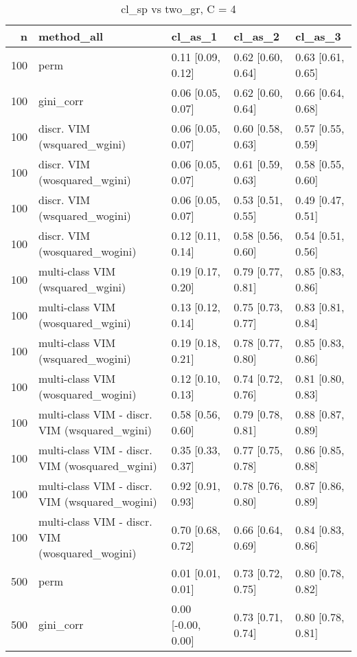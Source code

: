 \begin{table}[ht]
\centering
\caption{cl\_sp vs two\_gr, C = 4} 
\begin{tabular}{rllll}
  \hline
n & method\_all & cl\_as\_1 & cl\_as\_2 & cl\_as\_3 \\ 
  \hline
100 & perm & 0.11 [0.09, 0.12] & 0.62 [0.60, 0.64] & 0.63 [0.61, 0.65] \\ 
  100 & gini\_corr & 0.06 [0.05, 0.07] & 0.62 [0.60, 0.64] & 0.66 [0.64, 0.68] \\ 
  100 & discr. VIM (wsquared\_wgini) & 0.06 [0.05, 0.07] & 0.60 [0.58, 0.63] & 0.57 [0.55, 0.59] \\ 
  100 & discr. VIM (wosquared\_wgini) & 0.06 [0.05, 0.07] & 0.61 [0.59, 0.63] & 0.58 [0.55, 0.60] \\ 
  100 & discr. VIM (wsquared\_wogini) & 0.06 [0.05, 0.07] & 0.53 [0.51, 0.55] & 0.49 [0.47, 0.51] \\ 
  100 & discr. VIM (wosquared\_wogini) & 0.12 [0.11, 0.14] & 0.58 [0.56, 0.60] & 0.54 [0.51, 0.56] \\ 
  100 & multi-class VIM (wsquared\_wgini) & 0.19 [0.17, 0.20] & 0.79 [0.77, 0.81] & 0.85 [0.83, 0.86] \\ 
  100 & multi-class VIM (wosquared\_wgini) & 0.13 [0.12, 0.14] & 0.75 [0.73, 0.77] & 0.83 [0.81, 0.84] \\ 
  100 & multi-class VIM (wsquared\_wogini) & 0.19 [0.18, 0.21] & 0.78 [0.77, 0.80] & 0.85 [0.83, 0.86] \\ 
  100 & multi-class VIM (wosquared\_wogini) & 0.12 [0.10, 0.13] & 0.74 [0.72, 0.76] & 0.81 [0.80, 0.83] \\ 
  100 & multi-class VIM - discr. VIM (wsquared\_wgini) & 0.58 [0.56, 0.60] & 0.79 [0.78, 0.81] & 0.88 [0.87, 0.89] \\ 
  100 & multi-class VIM - discr. VIM (wosquared\_wgini) & 0.35 [0.33, 0.37] & 0.77 [0.75, 0.78] & 0.86 [0.85, 0.88] \\ 
  100 & multi-class VIM - discr. VIM (wsquared\_wogini) & 0.92 [0.91, 0.93] & 0.78 [0.76, 0.80] & 0.87 [0.86, 0.89] \\ 
  100 & multi-class VIM - discr. VIM (wosquared\_wogini) & 0.70 [0.68, 0.72] & 0.66 [0.64, 0.69] & 0.84 [0.83, 0.86] \\ 
   \hline 500 & perm & 0.01 [0.01, 0.01] & 0.73 [0.72, 0.75] & 0.80 [0.78, 0.82] \\ 
  500 & gini\_corr & 0.00 [-0.00, 0.00] & 0.73 [0.71, 0.74] & 0.80 [0.78, 0.81] \\ 

\end{tabular}
\end{table}

